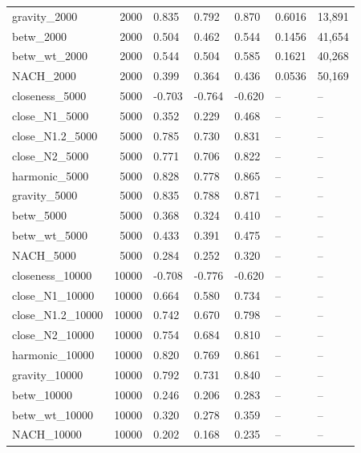 \begin{tabular}{lrlllll}
gravity\_2000 & 2000 & 0.835 & 0.792 & 0.870 & 0.6016 & 13,891 \\
betw\_2000 & 2000 & 0.504 & 0.462 & 0.544 & 0.1456 & 41,654 \\
betw\_wt\_2000 & 2000 & 0.544 & 0.504 & 0.585 & 0.1621 & 40,268 \\
NACH\_2000 & 2000 & 0.399 & 0.364 & 0.436 & 0.0536 & 50,169 \\
closeness\_5000 & 5000 & -0.703 & -0.764 & -0.620 & -- & -- \\
close\_N1\_5000 & 5000 & 0.352 & 0.229 & 0.468 & -- & -- \\
close\_N1.2\_5000 & 5000 & 0.785 & 0.730 & 0.831 & -- & -- \\
close\_N2\_5000 & 5000 & 0.771 & 0.706 & 0.822 & -- & -- \\
harmonic\_5000 & 5000 & 0.828 & 0.778 & 0.865 & -- & -- \\
gravity\_5000 & 5000 & 0.835 & 0.788 & 0.871 & -- & -- \\
betw\_5000 & 5000 & 0.368 & 0.324 & 0.410 & -- & -- \\
betw\_wt\_5000 & 5000 & 0.433 & 0.391 & 0.475 & -- & -- \\
NACH\_5000 & 5000 & 0.284 & 0.252 & 0.320 & -- & -- \\
closeness\_10000 & 10000 & -0.708 & -0.776 & -0.620 & -- & -- \\
close\_N1\_10000 & 10000 & 0.664 & 0.580 & 0.734 & -- & -- \\
close\_N1.2\_10000 & 10000 & 0.742 & 0.670 & 0.798 & -- & -- \\
close\_N2\_10000 & 10000 & 0.754 & 0.684 & 0.810 & -- & -- \\
harmonic\_10000 & 10000 & 0.820 & 0.769 & 0.861 & -- & -- \\
gravity\_10000 & 10000 & 0.792 & 0.731 & 0.840 & -- & -- \\
betw\_10000 & 10000 & 0.246 & 0.206 & 0.283 & -- & -- \\
betw\_wt\_10000 & 10000 & 0.320 & 0.278 & 0.359 & -- & -- \\
NACH\_10000 & 10000 & 0.202 & 0.168 & 0.235 & -- & -- \\
\bottomrule
\end{tabular}
